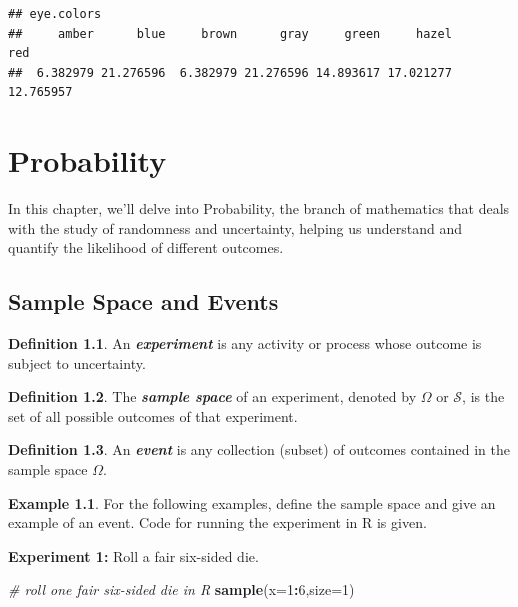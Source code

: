 \documentclass[
  11pt,
  oneside]{book}
\newenvironment{Shaded}{\begin{snugshade}}{\end{snugshade}}
\newcommand{\AttributeTok}[1]{\textcolor[rgb]{0.13,0.29,0.53}{#1}}
\newcommand{\CommentTok}[1]{\textcolor[rgb]{0.56,0.35,0.01}{\textit{#1}}}
\newcommand{\DecValTok}[1]{\textcolor[rgb]{0.00,0.00,0.81}{#1}}
\newcommand{\FunctionTok}[1]{\textcolor[rgb]{0.13,0.29,0.53}{\textbf{#1}}}
\newcommand{\NormalTok}[1]{#1}
\newcommand{\SpecialCharTok}[1]{\textcolor[rgb]{0.81,0.36,0.00}{\textbf{#1}}}
\theoremstyle{definition}
\newtheorem{definition}{Definition}[chapter]
\theoremstyle{definition}
\newtheorem{example}{Example}[chapter]
\theoremstyle{definition}
\theoremstyle{definition}
\theoremstyle{remark}
\begin{document}
\begin{verbatim}
## eye.colors
##     amber      blue     brown      gray     green     hazel       red 
##  6.382979 21.276596  6.382979 21.276596 14.893617 17.021277 12.765957
\end{verbatim}

\chapter{Probability}\label{probability}

In this chapter, we'll delve into Probability, the branch of mathematics that deals with the study of randomness and uncertainty, helping us understand and quantify the likelihood of different outcomes.

\section{Sample Space and Events}\label{sample-space-and-events}

\begin{definition}
An \textbf{\emph{experiment}} is any activity or process whose outcome is subject to uncertainty.
\end{definition}

\begin{definition}
The \textbf{\emph{sample space}} of an experiment, denoted by \(\Omega\) or \(\mathcal{S}\), is the set of all possible outcomes of that experiment.
\end{definition}

\begin{definition}
An \textbf{\emph{event}} is any collection (subset) of outcomes contained in the sample space \(\Omega\).
\end{definition}

\begin{example}
For the following examples, define the sample space and give an example of an event. Code for running the experiment in R is given.
\end{example}

\textbf{Experiment 1:} Roll a fair six-sided die.

\begin{Shaded}
\begin{Highlighting}[]
\CommentTok{\# roll one fair six{-}sided die in R}
\FunctionTok{sample}\NormalTok{(}\AttributeTok{x=}\DecValTok{1}\SpecialCharTok{:}\DecValTok{6}\NormalTok{,}\AttributeTok{size=}\DecValTok{1}\NormalTok{)}
\end{Highlighting}
\end{Shaded}
\end{document}
